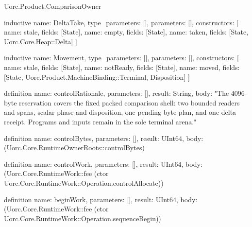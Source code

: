 \begin{lexlean}{Uorc.Product.ComparisonOwner}
\begin{semanticmodule}
inductive{
  name: DeltaTake,
  type_parameters: [],
  parameters: [],
  constructors: [
    {name: stale, fields: [State]},
    {name: empty, fields: [State]},
    {name: taken, fields: [State, Uorc.Core.Heap::Delta]}
  ]
}

inductive{
  name: Movement,
  type_parameters: [],
  parameters: [],
  constructors: [
    {name: stale, fields: [State]},
    {name: notReady, fields: [State]},
    {name: moved, fields: [State, Uorc.Product.MachineBinding::Terminal, Disposition]}
  ]
}

definition{
  name: controlRationale,
  parameters: [],
  result: String,
  body: "The 4096-byte reservation covers the fixed packed comparison shell: two bounded readers and spans, scalar phase and disposition, one pending byte plan, and one delta receipt. Programs and inputs remain in the sole terminal arena."
}

definition{
  name: controlBytes,
  parameters: [],
  result: UInt64,
  body: (Uorc.Core.RuntimeOwnerRoots::controlBytes)
}

definition{
  name: controlWork,
  parameters: [],
  result: UInt64,
  body: (Uorc.Core.RuntimeWork::fee (ctor Uorc.Core.RuntimeWork::Operation.controlAllocate))
}

definition{
  name: beginWork,
  parameters: [],
  result: UInt64,
  body: (Uorc.Core.RuntimeWork::fee (ctor Uorc.Core.RuntimeWork::Operation.sequenceBegin))
}


\end{semanticmodule}
\end{lexlean}
